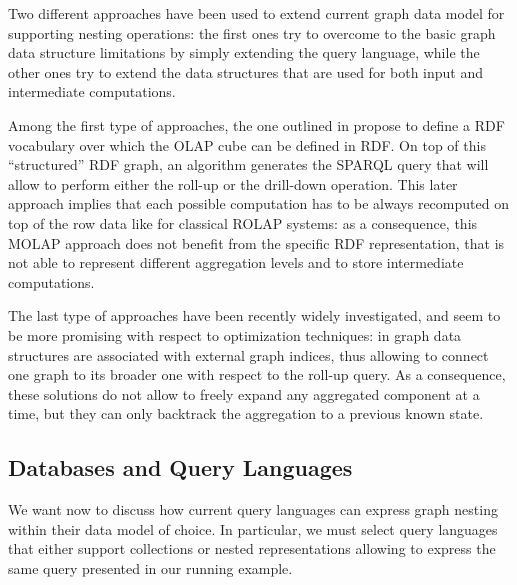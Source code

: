 Two different approaches have been used to extend current graph data model for supporting nesting operations:
the first ones try to overcome to the basic graph data structure limitations by simply extending the query language, while the other ones try to extend the data structures that are used for both input and intermediate computations. 


Among the first type of approaches, the one outlined in \cite{Etcheverry2012} propose to define a RDF vocabulary over which the OLAP cube can be defined in RDF. On top of this ``structured'' RDF graph, an algorithm generates the SPARQL query that will allow to perform either the roll-up or the drill-down operation. This later approach implies that each possible computation has to be always recomputed on top of the row data like for classical ROLAP systems: as a consequence, this MOLAP approach does not benefit from the specific RDF representation, that is not able to represent different aggregation levels and to store intermediate computations.

The last type of approaches have been recently widely investigated, and seem to be more promising with respect to optimization techniques: in \cite{Tian20085,ChenYZHY08,Qu2011} graph data structures are associated with external graph indices, thus allowing to connect one graph  to its broader one with respect to the roll-up query. As a consequence, these solutions do not allow to freely expand any aggregated component at a time, but they can only backtrack the aggregation to a previous known state. %


\subsection{Databases and Query Languages}\label{subsec:pathsumm}
We want now to discuss how current query languages can express graph nesting  within their data model of choice. In particular, we must select query languages that either support collections or nested representations allowing to express the same query presented in our running example. 

